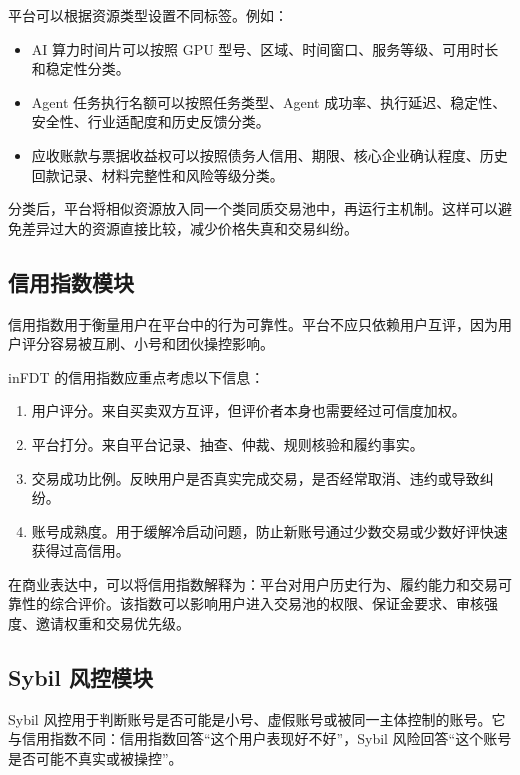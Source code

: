 \documentclass[UTF8,a4paper,12pt]{ctexart}
\begin{document}
平台可以根据资源类型设置不同标签。例如：

\begin{itemize}
    \item AI 算力时间片可以按照 GPU 型号、区域、时间窗口、服务等级、可用时长和稳定性分类。
    \item Agent 任务执行名额可以按照任务类型、Agent 成功率、执行延迟、稳定性、安全性、行业适配度和历史反馈分类。
    \item 应收账款与票据收益权可以按照债务人信用、期限、核心企业确认程度、历史回款记录、材料完整性和风险等级分类。
\end{itemize}

分类后，平台将相似资源放入同一个类同质交易池中，再运行主机制。这样可以避免差异过大的资源直接比较，减少价格失真和交易纠纷。



\subsection{信用指数模块}

信用指数用于衡量用户在平台中的行为可靠性。平台不应只依赖用户互评，因为用户评分容易被互刷、小号和团伙操控影响。

inFDT 的信用指数应重点考虑以下信息：

\begin{enumerate}
    \item 用户评分。来自买卖双方互评，但评价者本身也需要经过可信度加权。
    \item 平台打分。来自平台记录、抽查、仲裁、规则核验和履约事实。
    \item 交易成功比例。反映用户是否真实完成交易，是否经常取消、违约或导致纠纷。
    \item 账号成熟度。用于缓解冷启动问题，防止新账号通过少数交易或少数好评快速获得过高信用。
\end{enumerate}

在商业表达中，可以将信用指数解释为：平台对用户历史行为、履约能力和交易可靠性的综合评价。该指数可以影响用户进入交易池的权限、保证金要求、审核强度、邀请权重和交易优先级。

\subsection{Sybil 风控模块}

Sybil 风控用于判断账号是否可能是小号、虚假账号或被同一主体控制的账号。它与信用指数不同：信用指数回答“这个用户表现好不好”，Sybil 风险回答“这个账号是否可能不真实或被操控”。
\end{document}
